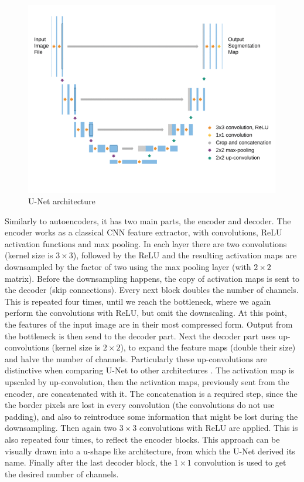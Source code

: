 \begin{figure}[H]
\begin{centering}
\includegraphics[width=12cm]{assets/images/unet.png}
\par\end{centering}
\caption{U-Net architecture \cite{Siddique2021}}
\label{fig:unet}
\end{figure}

Similarly to autoencoders, it has two main parts, the encoder and decoder. The encoder works as a classical CNN feature extractor, with convolutions, ReLU activation functions and max pooling. In each layer there are two convolutions (kernel size is $3\times3$), followed by the ReLU and the resulting activation maps are downsampled by the factor of two using the max pooling layer (with $2\times2$ matrix). Before the downsampling happens, the copy of activation maps is sent to the decoder (skip connections). Every next block doubles the number of channels. This is repeated four times, until we reach the bottleneck, where we again perform the convolutions with ReLU, but omit the downscaling. At this point, the features of the input image are in their most compressed form. Output from the bottleneck is then send to the decoder part. Next the decoder part uses up-convolutions (kernel size is $2\times2$), to expand the feature maps (double their size) and halve the number of channels. Particularly these up-convolutions are distinctive when comparing U-Net to other architectures \cite{Siddique2021}. The activation map is upscaled by up-convolution, then the activation maps, previously sent from the encoder, are concatenated with it. The concatenation is a required step, since the the border pixels are lost in every convolution (the convolutions do not use padding), and also to reintroduce some information that might be lost during the downsampling. Then again two $3\times3$ convolutions with ReLU are applied. This is also repeated four times, to reflect the encoder blocks. This approach can be visually drawn into a u-shape like architecture, from which the U-Net derived its name. Finally after the last decoder block, the $1\times1$ convolution is used to get the desired number of channels.


